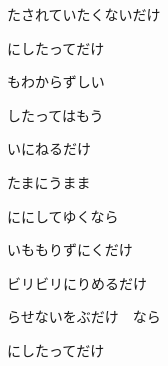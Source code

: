 \documentclass[a4paper,tate,twocolumn,12pt]{ltjtarticle}
\begin{document}
\begin{flushleft}
\begin{minipage}{\linewidth}
たされていたくないだけ
\end{minipage}

\vspace{2em}

\noindent\begin{minipage}{\linewidth}
にしたってだけ

もわからずしい

したってはもう

いにねるだけ

たまにうまま

ににしてゆくなら

いももりずにくだけ

ビリビリにりめるだけ

らせないをぶだけ　なら
\end{minipage}

\vspace{2em}

\noindent\begin{minipage}{\linewidth}
にしたってだけ
\end{minipage}

\end{flushleft}
\end{document}
